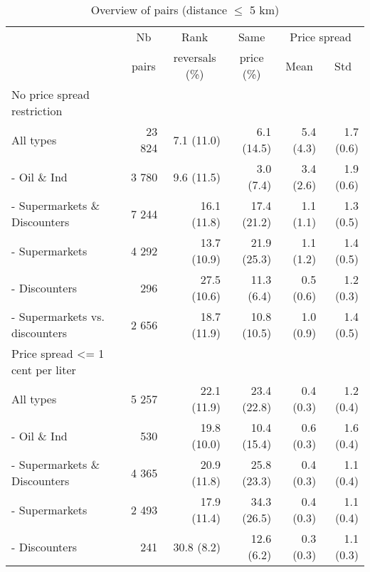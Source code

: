 \documentclass[english]{article}
\begin{document}
\begin{table}[H]
\begin{threeparttable}
\renewcommand{\arraystretch}{0.8} %
\caption{Overview of pairs (distance $\le$ 5 km)}
\label{tab:stats_pair_rank_reversals_5km}
    \begin{tabular}{lrrrrr}
    \toprule
    \toprule
          & \multicolumn{1}{c}{Nb} & \multicolumn{1}{c}{Rank} & \multicolumn{1}{c}{Same} & \multicolumn{2}{c}{Price spread} \\
          & \multicolumn{1}{c}{pairs} & \multicolumn{1}{c}{reversals (\%)} & \multicolumn{1}{c}{price (\%)} & \multicolumn{1}{c}{Mean} & \multicolumn{1}{c}{Std} \\
    \midrule
    No price spread restriction &       &       &       &       &  \\
    All types & 23 824 & 7.1 (11.0) & 6.1 (14.5) & 5.4 (4.3) & 1.7 (0.6) \\
    - Oil \& Ind & 3 780 & 9.6 (11.5) & 3.0 \phantom{0}(7.4) & 3.4 (2.6) & 1.9 (0.6) \\
    - Supermarkets \& Discounters & 7 244 & 16.1 (11.8) & 17.4 (21.2) & 1.1 (1.1) & 1.3 (0.5) \\
    \hspace*{4mm} - Supermarkets & 4 292 & 13.7 (10.9) & 21.9 (25.3) & 1.1 (1.2) & 1.4 (0.5) \\
    \hspace*{4mm} -  Discounters & 296   & 27.5 (10.6) & 11.3 \phantom{0}(6.4) & 0.5 (0.6) & 1.2 (0.3) \\
    \hspace*{4mm} -  Supermarkets vs. discounters & 2 656 & 18.7 (11.9) & 10.8 (10.5) & 1.0 (0.9) & 1.4 (0.5) \\
    \midrule
    Price spread <= 1 cent per liter &       &       &       &       &  \\
    All types & 5 257 & 22.1 (11.9) & 23.4 (22.8) & 0.4 (0.3) & 1.2 (0.4) \\
    - Oil \& Ind & 530   & 19.8 (10.0) & 10.4 (15.4) & 0.6 (0.3) & 1.6 (0.4) \\
    - Supermarkets \& Discounters & 4 365 & 20.9 (11.8) & 25.8 (23.3) & 0.4 (0.3) & 1.1 (0.4) \\
    \hspace*{4mm} - Supermarkets & 2 493 & 17.9 (11.4) & 34.3 (26.5) & 0.4 (0.3) & 1.1 (0.4) \\
    \hspace*{4mm} - Discounters & 241   & 30.8 \phantom{0}(8.2) & 12.6 \phantom{0}(6.2) & 0.3 (0.3) & 1.1 (0.3) \\

\end{tabular}
\end{threeparttable}
\end{table}
\end{document}
